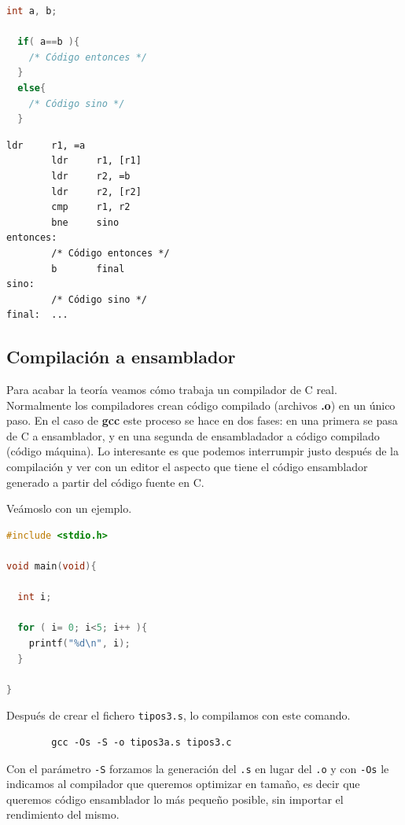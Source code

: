 \begin{lstlisting}[caption={Estructura if en C (tipos2.c)},label={lst:codigoPract2_3},language=C]
  int a, b;

  if( a==b ){ 
    /* Código entonces */
  }
  else{
    /* Código sino */
  }
\end{lstlisting}

\begin{lstlisting}[caption={Traducción de la estructura {\tt if}},label={lst:codigoPract2_4}]
        ldr     r1, =a
        ldr     r1, [r1]
        ldr     r2, =b
        ldr     r2, [r2]
        cmp     r1, r2
        bne     sino
entonces:
        /* Código entonces */
        b       final
sino:
        /* Código sino */
final:  ...
\end{lstlisting}

\subsection{Compilación a ensamblador}

Para acabar la teoría veamos cómo trabaja un compilador de C real. Normalmente
los compiladores crean código compilado (archivos {\bf .o}) en un
único paso. En el caso de {\bf gcc} este proceso se hace en dos fases: en una
primera se pasa de C a ensamblador, y en una segunda de ensambladador a código
compilado (código máquina). Lo interesante es que podemos interrumpir justo
después de la compilación y ver con un editor el aspecto que tiene el código
ensamblador generado a partir del código fuente en C.

Veámoslo con un ejemplo.

\begin{lstlisting}[caption={Código del programa tipos3.c},label={lst:codigoPract2_5},language=C]
#include <stdio.h>

void main(void){

  int i;

  for ( i= 0; i<5; i++ ){
    printf("%d\n", i);
  }

}
\end{lstlisting}

Después de crear el fichero {\tt tipos3.s}, lo compilamos con este comando.

\begin{lstlisting}
        gcc -Os -S -o tipos3a.s tipos3.c
\end{lstlisting}

Con el parámetro {\tt -S} forzamos la generación del {\tt .s} en lugar del
{\tt .o} y con {\tt -Os} le indicamos al compilador que queremos optimizar en
tamaño, es decir que queremos código ensamblador lo más pequeño posible, sin
importar el rendimiento del mismo.

